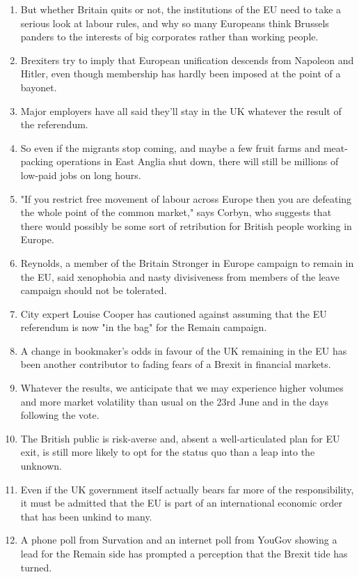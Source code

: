\documentclass[fleqn,moreauthors,10pt]{ds_report}
\begin{document}
\begin{enumerate}
    \item But whether Britain quits or not, the institutions of the EU need to take a serious look at labour rules, and why so many Europeans think Brussels panders to the interests of big corporates rather than working people.
    \item Brexiters try to imply that European unification descends from Napoleon and Hitler, even though membership has hardly been imposed at the point of a bayonet.
    \item Major employers have all said they'll stay in the UK whatever the result of the referendum.
    \item So even if the migrants stop coming, and maybe a few fruit farms and meat-packing operations in East Anglia shut down, there will still be millions of low-paid jobs on long hours.
    \item "If you restrict free movement of labour across Europe then you are defeating the whole point of the common market," says Corbyn, who suggests that there would possibly be some sort of retribution for British people working in Europe.
    \item Reynolds, a member of the Britain Stronger in Europe campaign to remain in the EU, said xenophobia and nasty divisiveness from members of the leave campaign should not be tolerated.
    \item City expert Louise Cooper has cautioned against assuming that the EU referendum is now "in the bag" for the Remain campaign.
    \item A change in bookmaker's odds in favour of the UK remaining in the EU has been another contributor to fading fears of a Brexit in financial markets.
    \item Whatever the results, we anticipate that we may experience higher volumes and more market volatility than usual on the 23rd June and in the days following the vote.
    \item The British public is risk-averse and, absent a well-articulated plan for EU exit, is still more likely to opt for the status quo than a leap into the unknown.
    \item Even if the UK government itself actually bears far more of the responsibility, it must be admitted that the EU is part of an international economic order that has been unkind to many.
    \item A phone poll from Survation and an internet poll from YouGov showing a lead for the Remain side has prompted a perception that the Brexit tide has turned.

\end{enumerate}
\end{document}
